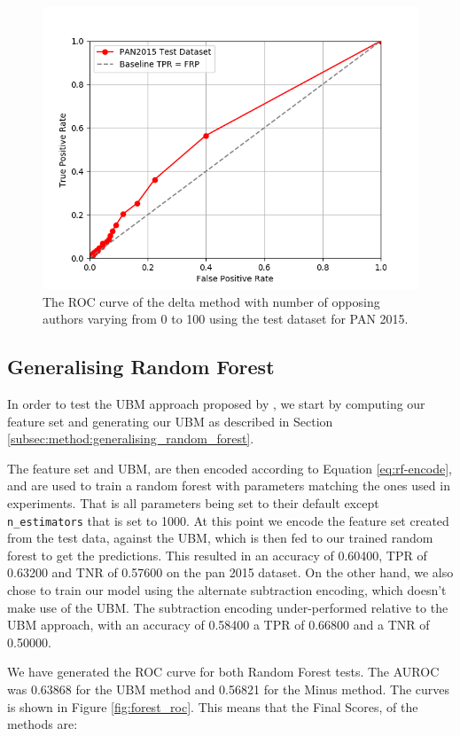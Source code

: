 \begin{figure}
    \centering
    \includegraphics[width=.7\textwidth]{./pictures/delta_method_roc.png}
    \caption{The ROC curve of the delta method with number of opposing authors
    varying from 0 to 100 using the test dataset for PAN 2015.}
    \label{fig:delta_method_roc}
\end{figure}

\subsection{Generalising Random Forest} \label{subsec:results:generalising_random_forest}
In order to test the \gls{UBM} approach proposed by \cite{pacheco2015}, we start
by computing our feature set and generating our \gls{UBM} as described in
Section \ref{subsec:method:generalising_random_forest}.

The feature set and \gls{UBM}, are then encoded according to Equation
\eqref{eq:rf-encode}, and are used to train a random forest with parameters
matching the ones used in experiments. That is all parameters being set to their
default except \texttt{n\_estimators} that is set to 1000. At this point we
encode the feature set created from the test data, against the \gls{UBM}, which
is then fed to our trained random forest to get the predictions. This resulted
in an accuracy of 0.60400, \gls{TPR} of 0.63200 and \gls{TNR} of 0.57600 on the
pan 2015 dataset. On the other hand, we also chose to train our model using the
alternate subtraction encoding, which doesn't make use of the \gls{UBM}. The
subtraction encoding under-performed relative to the \gls{UBM} approach, with an
accuracy of 0.58400 a \gls{TPR} of 0.66800 and a \gls{TNR} of 0.50000.

We have generated the \gls{ROC} curve for both Random Forest tests. The
\gls{AUROC} was 0.63868 for the \gls{UBM} method and 0.56821 for the Minus
method. The curves is shown in Figure \ref{fig:forest_roc}. This means that the
Final Scores, of the methods are:

